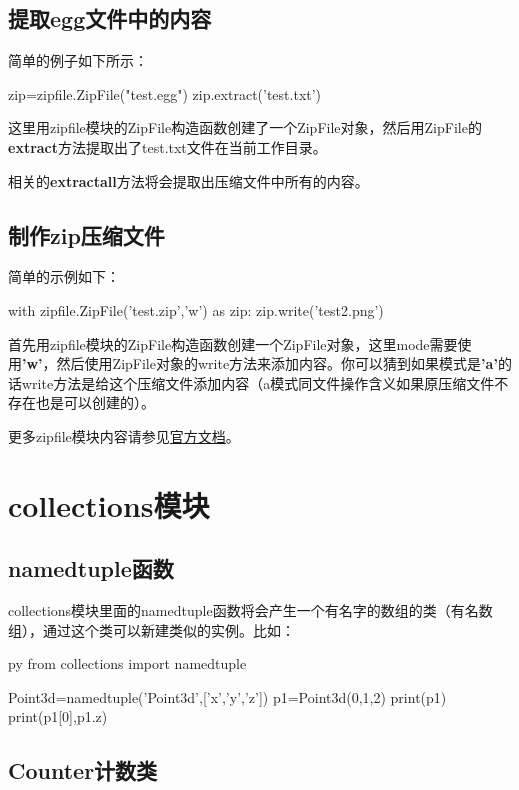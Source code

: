 \documentclass[12pt,oneside]{book}
\begin{document}
\begin{common-format}
\section{提取egg文件中的内容}
简单的例子如下所示：
\begin{tcbpython}[]
zip=zipfile.ZipFile("test.egg")
zip.extract('test.txt')
\end{tcbpython}
这里用zipfile模块的ZipFile构造函数创建了一个ZipFile对象，然后用ZipFile的\textbf{extract}方法提取出了test.txt文件在当前工作目录。

相关的\textbf{extractall}方法将会提取出压缩文件中所有的内容。

\section{制作zip压缩文件}
简单的示例如下：
\begin{tcbpython}[]
with zipfile.ZipFile('test.zip','w') as zip:
    zip.write('test2.png')
\end{tcbpython}
首先用zipfile模块的ZipFile构造函数创建一个ZipFile对象，这里mode需要使用\textbf{'w'}，然后使用ZipFile对象的write方法来添加内容。你可以猜到如果模式是\textbf{'a'}的话write方法是给这个压缩文件添加内容（a模式同文件操作含义如果原压缩文件不存在也是可以创建的）。



\begin{large}
更多zipfile模块内容请参见\href{https://docs.python.org/3.4/library/zipfile.html}{官方文档}。
\end{large}


\chapter{collections模块}
\section{namedtuple函数}
collections模块里面的namedtuple函数将会产生一个有名字的数组的类（有名数组），通过这个类可以新建类似的实例。比如：
\begin{xverbatim}[129]{py}
from collections import namedtuple

Point3d=namedtuple('Point3d',['x','y','z'])
p1=Point3d(0,1,2)
print(p1)
print(p1[0],p1.z)
\end{xverbatim}

\section{Counter计数类}




\end{common-format}
\end{document}
